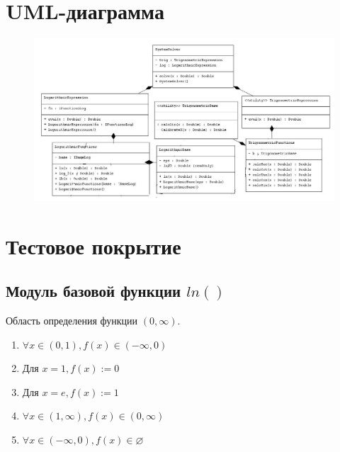 \documentclass[a4paper,10pt]{article}
\begin{document}
\section*{UML-диаграмма}
		\begin{figure}[h!]
			\includegraphics[scale=0.6]{./images/uml.jpg}
		\end{figure}
\section*{Тестовое покрытие}
    \subsection*{Модуль базовой функции $ln()$}

		Область определения функции $(0, \infty)$. 
		\begin{enumerate}
			\item $\forall x \in (0, 1), f(x) \in (-\infty, 0)$
			\item $\text{Для } x = 1, f(x) := 0$
			\item $\text{Для } x = e, f(x) := 1$
			\item $\forall x \in (1, \infty), f(x) \in (0, \infty)$
			\item $\forall x \in (-\infty, 0), f(x) \in \varnothing$
		\end{enumerate}
\end{document}
